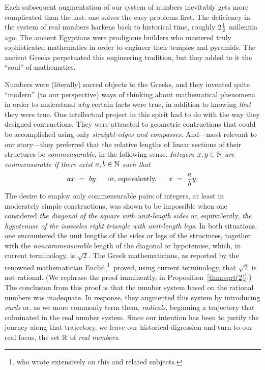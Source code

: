 Each subsequent augmentation of our system of numbers inevitably gets
more complicated than the last: one solves the easy problems first.
The deficiency in the system of real numbers harkens back to
historical time, roughly $2 {1 \over 2}$ millennia ago.  The ancient
Egyptians were prodigious builders who mastered truly sophisticated
mathematics in order to engineer their temples and pyramids.  The
ancient Greeks perpetuated this engineering tradition, but they added
to it the ``soul'' of mathematics.

Numbers were (literally) sacred objects to the Greeks, and they
invented quite ``modern'' (to our perspective) ways of thinking about
mathematical phenomena in order to understand {\em why} certain facts
were true, in addition to knowing {\em that} they were true.  One
intellectual project in this spirit had to do with the way they
designed contructions.  They were attracted to geometric contructions
that could be accomplished using only {\em straight-edges and
  compasses}.  And---most relevant to our story---they preferred that
the relative lengths of linear sections of their structures be {\em
  commensurable},
in the following sense.  {\em Integers $x,y \in \mathbb{N}$ are {\em
    commensurable} if there exist $a, b \in \mathbb{N}$ such that}
\[ ax \ = \ by \ \ \ \ \mbox{ or, equivalently, } \ \ \ \ x \ = \ {a
  \over b} y.
\]
The desire to employ only commensurable pairs of integers, at least in
moderately simple constructions, was shown to be impossible when one
considered {\it the diagonal of the square with unit-length sides} or,
equivalently, {\it the hypotenuse of the isosceles right triangle with
  unit-length legs}.  In both situations, one encountered the unit
lengths of the sides or legs of the structures, together with the {\em
  noncommensurable} length of the diagonal or hypotenuse, which, in
current terminology, is $\sqrt{2}$.  The Greek mathematicians, as
reported by the renowned mathematician Euclid,\footnote{who wrote
  extensively on this and related subjects.}~proved, using current
terminology, that $\sqrt{2}$ is not rational.  (We rephrase the proof
imminently, in Proposition~\ref{thm:sqrt(2)}.)  The conclusion from
this proof is that the number system based on the rational numbers was
inadequate.  In response, they augmented this system by introducing
{\it surds}  or, as we more commonly term them,
{\it radicals},  beginning a trajectory that
culminated in the real number system.  Since our intention has been to
justify the journey along that trajectory, we leave our historical
digression and turn to our real focus, the set $\mathbb{R}$ of {\it real
  numbers}.

